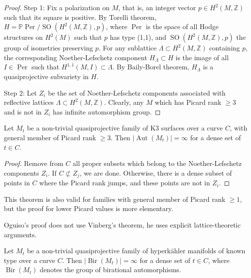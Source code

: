 \begin{proof}
Step 1: Fix a polarization on $M$, that is, an
integer vector $p \in H^2(M,\mathbb{Z})$ such that
its square is positive. By Torelli theorem,
$H=\mathbb{P}\operatorname{Per}/\operatorname{SO}(H^2(M,\mathbb{Z}),p)$,
where $\operatorname{Per}$ is the space of all Hodge
structures on $H^2(M)$ such that $p$ has type
(1,1), and $\operatorname{SO}(H^2(M,\mathbb{Z}),p)$
the group of isometries preserving $p$. For any
sublattice $\Lambda \subset H^2(M,\mathbb{Z})$
containing $p$, the corresponding
Noether-Lefschetz component $H_{\Lambda}\subset H$
is the image of all $I \in \operatorname{Per}$ such
that $H^{1,1}(M,I)\subset \Lambda$. By Baily-Borel
theorem, $H_{\Lambda}$ is a quasiprojective
subvariety in $H$.

Step 2: Let $Z_i$ be the set of Noether-Lefschetz
components associated with reflective lattices
$\Lambda \subset H^2(M,\mathbb{Z})$. Clearly, any
$M$ which has Picard rank $\geq 3$ and is not in
$Z_i$ has infinite automorphism group.
\end{proof}

\begin{theorem}[K. Oguiso, 2003]
\label{theorem-oguiso-2003}
Let $M_t$ be a non-trivial quasiprojective family
of K3 surfaces over a curve $C$, with general
member of Picard rank $\geq 3$. Then
$|\operatorname{Aut}(M_t)|=\infty$ for a dense set
of $t \in C$.
\end{theorem}

\begin{proof}
Remove from $C$ all proper subsets which belong to
the Noether-Lefschetz components $Z_i$. If
$C \not\subset Z_j$, we are done. Otherwise, there
is a dense subset of points in $C$ where the Picard
rank jumps, and these points are not in $Z_i$.
\end{proof}

\begin{remark}
\label{remark-oguiso-lower-picard}
This theorem is also valid for families with
general member of Picard rank $\geq 1$, but the
proof for lower Picard values is more elementary.
\end{remark}

\begin{remark}
\label{remark-oguiso-vinberg}
Oguiso's proof does not use Vinberg's theorem, he
uses explicit lattice-theoretic arguments.
\end{remark}

\begin{theorem}
\label{theorem-denisi-onorati-rizzo-viktorova}
Let $M_t$ be a non-trivial quasiprojective family
of hyperkähler manifolds of known type over a
curve $C$. Then $|\operatorname{Bir}(M_t)|=\infty$
for a dense set of $t \in C$, where
$\operatorname{Bir}(M_t)$ denotes the group of
birational automorphisms.
\end{theorem}

